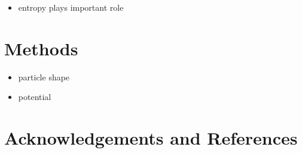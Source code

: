 \documentclass[epj,twocolumn]{webofc}
\begin{document}
\begin{itemize}
    \item entropy plays important role
\end{itemize}

\section{Methods}
\label{sec:Methods}

\begin{itemize}
    \item particle shape
    \item potential
\end{itemize}

\section*{Acknowledgements and References}
%
% 
%
%
\end{document}
